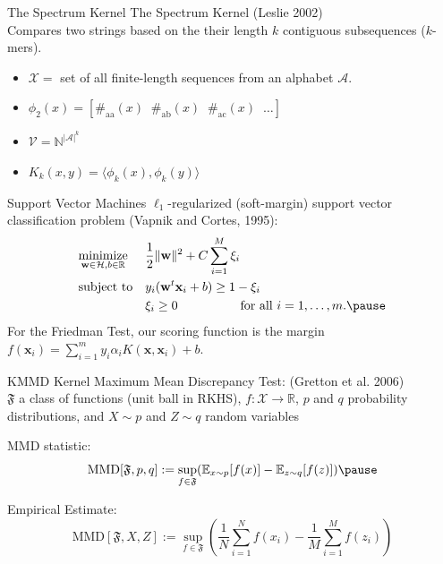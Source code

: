 \documentclass{beamer}
\providecommand{\norm}[1]{\lVert#1\rVert}
\begin{document}
\begin{frame}{The Spectrum Kernel}
  The Spectrum Kernel (Leslie 2002) \\
  Compares two strings based on the their length $k$ contiguous
  subsequences ($k$-mers). \pause
  \begin{itemize}
    \item $\mathcal{X} = $ set of all finite-length sequences from an alphabet $\mathcal{A}$. \pause
    \item $\phi_2(x) = [\#_{\text{aa}}(x) \;\; \#_{\text{ab}}(x) \;\; \#_{\text{ac}}(x) \;\; \ldots ]$ \pause
    \item $\mathcal{V} = \mathbb{N}^{|\mathcal{A}|^k}$ \pause
    \item $K_k(x,y) = \langle \phi_k(x), \phi_k(y) \rangle$
  \end{itemize}
\end{frame}

\begin{frame}{Support Vector Machines}
$\ell_1$-regularized (soft-margin) support vector classification problem
(Vapnik and Cortes, 1995):
\begin{equation*}
\begin{aligned}
& \underset{\mathbf{w} \in \mathcal{H}, b \in \mathbb{R}}{\text{minimize}}
& &\frac{1}{2}\norm{\mathbf{w}}^2+C\sum_{i=1}^M \xi_i \\
& \text{subject to}
& & y_i(\mathbf{w}^t \mathbf{x}_i + b) \geq 1 - \xi_i \\
&&& \xi_i \geq 0 \qquad \qquad \quad \text{for all } i=1,\ldots,m. \pause
\end{aligned}
\end{equation*}
For the Friedman Test, our scoring function is the margin
$f(\mathbf{x}_i) = \sum_{i=1}^m y_i \alpha_i K(\mathbf{x}, \mathbf{x}_i) + b$.
\end{frame}

\begin{frame}{KMMD}
  Kernel Maximum Mean Discrepancy Test: (Gretton et al. 2006) \\ \pause
  $\mathfrak{F}$ a class of functions (unit ball in RKHS), $f:\mathcal{X} \to \mathbb{R}$,
  $p$ and $q$ probability distributions, and $X \sim p$ and $Z \sim q$ random variables \\ \pause

  MMD statistic:
  \begin{equation*}
    \text{MMD}[\mathfrak{F},p,q] := \sup_{f\in
      \mathfrak{F}}(\mathbb{E}_{x\sim p}[f(x)] - \mathbb{E}_{z\sim q}[f(z)]) \pause
  \end{equation*}

  Empirical Estimate:
  \begin{equation*}
    \text{MMD}[\mathfrak{F},X,Z] := \sup_{f\in
      \mathfrak{F}}\left (\frac{1}{N}\sum_{i=1}^Nf(x_i) -
    \frac{1}{M}\sum_{i=1}^M f(z_i) \right )
  \end{equation*}
\end{frame}
\end{document}

